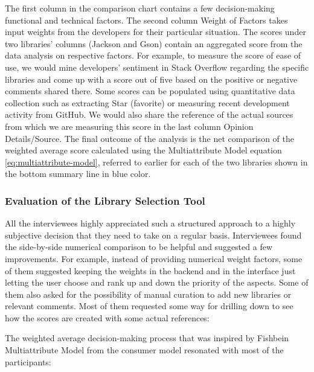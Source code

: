 The first column in the comparison chart contains a few decision-making functional and technical factors. The second column Weight of Factors takes input weights from the developers for their particular situation. The scores under two libraries' columns (Jackson and Gson) contain an aggregated score from the data analysis on respective factors. For example, to measure the score of ease of use, we would mine developers' sentiment in Stack Overflow regarding the specific libraries and come up with a score out of five based on the positive or negative comments shared there. Some scores can be populated using quantitative data collection such as extracting Star (favorite) or measuring recent development activity from GitHub. We would also share the reference of the actual sources from which we are measuring this score in the last column Opinion Details/Source. The final outcome of the analysis is the net comparison of the weighted average score calculated using the Multiattribute Model equation \ref{eq:multiattribute-model}, referred to earlier for each of the two libraries shown in the bottom summary line in blue color. 



\subsubsection{Evaluation of the Library Selection Tool}
All the interviewees highly appreciated such a structured approach to a highly subjective decision that they need to take on a regular basis. Interviewees found the side-by-side numerical comparison to be helpful and suggested a few improvements. For example, instead of providing numerical weight factors, some of them suggested keeping the weights in the backend and in the interface just letting the user choose and rank up and down the priority of the aspects. Some of them also asked for the possibility of manual curation to add new libraries or relevant comments. Most of them requested some way for drilling down to see how the scores are created with some actual references:

The weighted average decision-making process that was inspired by Fishbein Multiattribute Model \cite{fishbein1967attitude} from the consumer model resonated with most of the participants:

